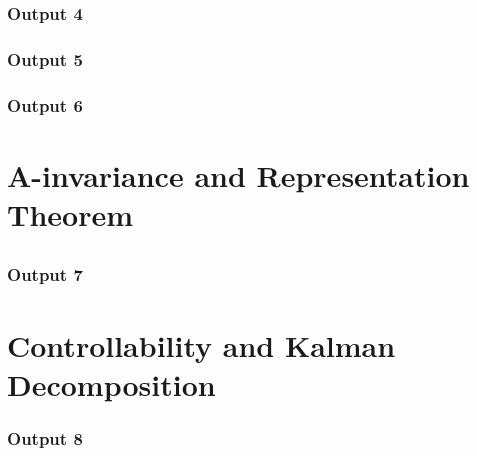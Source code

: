 \documentclass[10pt]{article}
\begin{document}
\subsubsection{Output 4}
\subsubsection{Output 5}
\subsubsection{Output 6}

\section{A-invariance and Representation Theorem}
\subsection{}
\subsubsection{Output 7}

\section{Controllability and Kalman Decomposition}
\subsubsection{Output 8}
\end{document}
